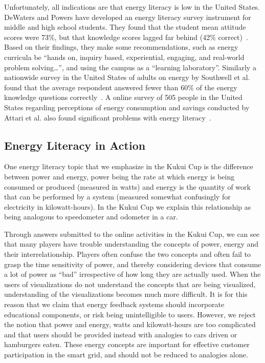 \documentclass[10pt, conference, compsocconf]{IEEEtran-old}
\begin{document}
Unfortunately, all indications are that energy literacy is low in the United States. DeWaters and Powers have developed an energy literacy survey instrument for middle and high school students. They found that the student mean attitude scores were 73\%, but that knowledge scores lagged far behind (42\% correct)~\cite{DeWaters2011}. Based on their findings, they make some recommendations, such as energy curricula be ``hands on, inquiry based, experiential, engaging, and real-world problem solving\ldots'', and using the campus as a ``learning laboratory''. Similarly a nationwide survey in the United States of adults on energy by Southwell et al. found that the average respondent answered fewer than 60\% of the energy knowledge questions correctly~\cite{Southwell2012}. A online survey of 505 people in the United States regarding perceptions of energy consumption and savings conducted by Attari et al. also found significant problems with energy literacy~\cite{Attari2010}.

\subsection{Energy Literacy in Action}

One energy literacy topic that we emphasize in the Kukui Cup is the difference between power and energy, power being the rate at which energy is being consumed or produced (measured in watts) and energy is the quantity of work that can be performed by a system (measured somewhat confusingly for electricity in kilowatt-hours). In the Kukui Cup we explain this relationship as being analogous to speedometer and odometer in a car.

Through answers submitted to the online activities in the Kukui Cup, we can see that many players have trouble understanding the concepts of power, energy and their interrelationship. Players often confuse the two concepts and often fail to grasp the time sensitivity of power, and thereby considering devices that consume a lot of power as ``bad'' irrespective of how long they are actually used. When the users of visualizations do not understand the concepts that are being visualized, understanding of the visualizations becomes much more difficult. It is for this reason that we claim that energy feedback systems should incorporate educational components, or risk being unintelligible to users. However, we reject the notion that power and energy, watts and kilowatt-hours are too complicated and that users should be provided instead with analogies to cars driven or hamburgers eaten. These energy concepts are important for effective customer participation in the smart grid, and should not be reduced to analogies alone.
\end{document}
